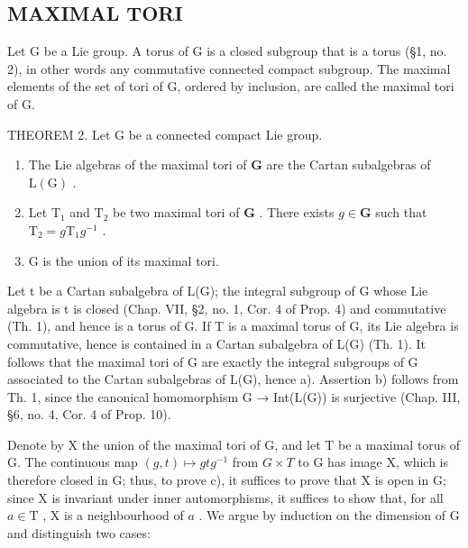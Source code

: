 \subsection{MAXIMAL TORI}

Let G be a Lie group. A torus of G is a closed subgroup that is a torus (§1, no. 2), in other words any commutative connected compact subgroup. The maximal elements of the set of tori of G, ordered by inclusion, are called the maximal tori of G.

THEOREM 2. Let G be a connected compact Lie group.

\begin{enumerate}
\def\labelenumi{\alph{enumi})}
\item
  The Lie algebras of the maximal tori of \(\mathbf{G}\) are the Cartan subalgebras of \(\mathrm{L}(\mathrm{G})\) .
\item
  Let \(\mathrm{T}_1\) and \(\mathrm{T}_2\) be two maximal tori of \(\mathbf{G}\) . There exists \(g \in \mathbf{G}\) such that \(\mathrm{T}_2 = g\mathrm{T}_1g^{-1}\) .
\item
  G is the union of its maximal tori.
\end{enumerate}

Let t be a Cartan subalgebra of L(G); the integral subgroup of G whose Lie algebra is t is closed (Chap. VII, §2, no. 1, Cor. 4 of Prop. 4) and commutative (Th. 1), and hence is a torus of G. If T is a maximal torus of G, its Lie algebra is commutative, hence is contained in a Cartan subalgebra of L(G) (Th. 1). It follows that the maximal tori of G are exactly the integral subgroups of G associated to the Cartan subalgebras of L(G), hence a). Assertion b) follows from Th. 1, since the canonical homomorphism G → Int(L(G)) is surjective (Chap. III, §6, no. 4, Cor. 4 of Prop. 10).

Denote by X the union of the maximal tori of G, and let T be a maximal torus of G. The continuous map \((g,t)\mapsto gtg^{-1}\) from \(G\times T\) to G has image X, which is therefore closed in G; thus, to prove c), it suffices to prove that X is open in G; since X is invariant under inner automorphisms, it suffices to show that, for all \(a \in \mathrm{T}\) , \(\mathrm{X}\) is a neighbourhood of \(a\) . We argue by induction on the dimension of \(\mathrm{G}\) and distinguish two cases:


